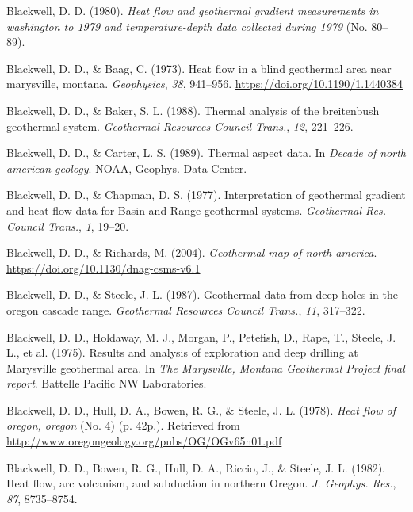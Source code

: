 \begin{CSLReferences}{1}{1}
\leavevmode{}%
Blackwell, D. D. (1980). \emph{Heat flow and geothermal gradient measurements in washington to 1979 and temperature-depth data collected during 1979} (No. 80--89).

\leavevmode{}%
Blackwell, D. D., \& Baag, C. (1973). Heat flow in a blind geothermal area near marysville, montana. \emph{Geophysics}, \emph{38}, 941--956. \url{https://doi.org/10.1190/1.1440384}

\leavevmode{}%
Blackwell, D. D., \& Baker, S. L. (1988). Thermal analysis of the breitenbush geothermal system. \emph{Geothermal Resources Council Trans.}, \emph{12}, 221--226.

\leavevmode{}%
Blackwell, D. D., \& Carter, L. S. (1989). Thermal aspect data. In \emph{Decade of north american geology}. NOAA, Geophys. Data Center.

\leavevmode{}%
Blackwell, D. D., \& Chapman, D. S. (1977). Interpretation of geothermal gradient and heat flow data for {Basin and Range} geothermal systems. \emph{Geothermal Res. Council Trans.}, \emph{1}, 19--20.

\leavevmode{}%
Blackwell, D. D., \& Richards, M. (2004). \emph{Geothermal map of north america}. \url{https://doi.org/10.1130/dnag-csms-v6.1}

\leavevmode{}%
Blackwell, D. D., \& Steele, J. L. (1987). Geothermal data from deep holes in the oregon cascade range. \emph{Geothermal Resources Council Trans.}, \emph{11}, 317--322.

\leavevmode{}%
Blackwell, D. D., Holdaway, M. J., Morgan, P., Petefish, D., Rape, T., Steele, J. L., et al. (1975). Results and analysis of exploration and deep drilling at {Marysville} geothermal area. In \emph{The {Marysville, Montana Geothermal Project} final report}. Battelle Pacific NW Laboratories.

\leavevmode{}%
Blackwell, D. D., Hull, D. A., Bowen, R. G., \& Steele, J. L. (1978). \emph{Heat flow of oregon, oregon} (No. 4) (p. 42p.). Retrieved from \url{http://www.oregongeology.org/pubs/OG/OGv65n01.pdf}

\leavevmode{}%
Blackwell, D. D., Bowen, R. G., Hull, D. A., Riccio, J., \& Steele, J. L. (1982). Heat flow, arc volcanism, and subduction in northern {Oregon}. \emph{J. Geophys. Res.}, \emph{87}, 8735--8754.


\end{CSLReferences}
